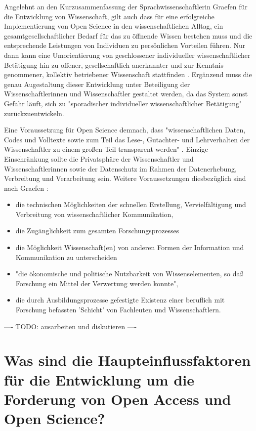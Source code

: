 Angelehnt an den Kurzusammenfassung der Sprachwissenschaftlerin Graefen für die Entwicklung von Wissenschaft, gilt auch dass für eine erfolgreiche Implementierung von Open Science in den wissenschaftlichen Alltag, ein gesamtgesellschaftlicher Bedarf für das zu öffnende Wissen bestehen muss und die entsprechende Leistungen von Individuen zu persönlichen Vorteilen führen. Nur dann kann eine Umorientierung von geschlossener individueller wissenschaftlicher Betätigung hin zu offener, gesellschaftlich anerkannter und zur Kenntnis genommener, kollektiv betriebener Wissenschaft stattfinden \cite{graefen2007_wissenschaftliche_artikel}. Ergänzend muss die genau Augestaltung dieser Entwicklung unter Beteiligung der Wissenschaftlerinnen und Wissenschaftler gestaltet werden, da das System sonst Gefahr läuft, sich zu "sporadischer individueller wissenschaftlicher Betätigung" \cite{graefen2007_wissenschaftliche_artikel} zurückzuentwickeln.

Eine Voraussetzung für Open Science demnach, dass "wissenschaftlichen Daten, Codes und Volltexte sowie zum Teil das Lese-, Gutachter- und Lehrverhalten der Wissenschaftler zu einem großen Teil transparent werden" \cite{brembs2015open}. Einzige Einschränkung sollte die Privatsphäre der Wissenschaftler und Wissenschaftlerinnen sowie der Datenschutz im Rahmen der Datenerhebung, Verbreitung und Verarbeitung sein. Weitere Voraussetzungen diesbezüglich sind nach Graefen \cite{graefen2007_wissenschaftliche_artikel}:
\begin{itemize}
\item die technischen Möglichkeiten der schnellen Erstellung, Vervielfältigung und Verbreitung von wissenschaftlicher Kommunikation,
\item die Zugänglichkeit zum gesamten Forschungsprozesses
\item die Möglichkeit Wissenschaft(en) von anderen Formen der Information und Kommunikation zu unterscheiden
\item "die ökonomische und politische Nutzbarkeit von Wissenselementen, so daß
Forschung ein Mittel der Verwertung werden konnte",
\item die durch Ausbildungsprozesse gefestigte Existenz einer beruflich mit Forschung befassten 'Schicht' von Fachleuten und Wissenschaftlern.
\end{itemize}

---- TODO: ausarbeiten und diskutieren ----

\section{Was sind die Haupteinflussfaktoren für die Entwicklung um die Forderung von Open Access und Open Science?}

